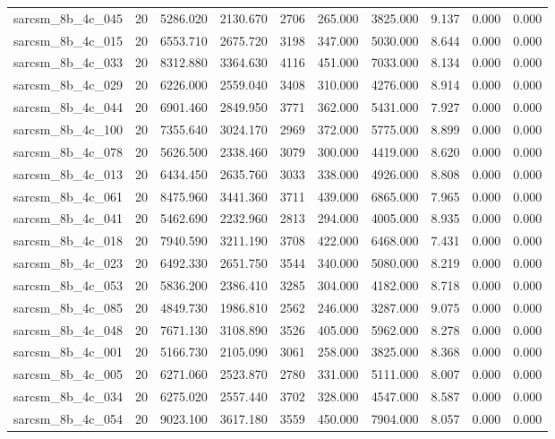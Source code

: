 \begin{tabular}{lrrrrrrrrr}
sarcsm\_8b\_4c\_045 & 20 & 5286.020 & 2130.670 & 2706 & 265.000 & 3825.000 & 9.137 & 0.000 & 0.000 \\
sarcsm\_8b\_4c\_015 & 20 & 6553.710 & 2675.720 & 3198 & 347.000 & 5030.000 & 8.644 & 0.000 & 0.000 \\
sarcsm\_8b\_4c\_033 & 20 & 8312.880 & 3364.630 & 4116 & 451.000 & 7033.000 & 8.134 & 0.000 & 0.000 \\
sarcsm\_8b\_4c\_029 & 20 & 6226.000 & 2559.040 & 3408 & 310.000 & 4276.000 & 8.914 & 0.000 & 0.000 \\
sarcsm\_8b\_4c\_044 & 20 & 6901.460 & 2849.950 & 3771 & 362.000 & 5431.000 & 7.927 & 0.000 & 0.000 \\
sarcsm\_8b\_4c\_100 & 20 & 7355.640 & 3024.170 & 2969 & 372.000 & 5775.000 & 8.899 & 0.000 & 0.000 \\
sarcsm\_8b\_4c\_078 & 20 & 5626.500 & 2338.460 & 3079 & 300.000 & 4419.000 & 8.620 & 0.000 & 0.000 \\
sarcsm\_8b\_4c\_013 & 20 & 6434.450 & 2635.760 & 3033 & 338.000 & 4926.000 & 8.808 & 0.000 & 0.000 \\
sarcsm\_8b\_4c\_061 & 20 & 8475.960 & 3441.360 & 3711 & 439.000 & 6865.000 & 7.965 & 0.000 & 0.000 \\
sarcsm\_8b\_4c\_041 & 20 & 5462.690 & 2232.960 & 2813 & 294.000 & 4005.000 & 8.935 & 0.000 & 0.000 \\
sarcsm\_8b\_4c\_018 & 20 & 7940.590 & 3211.190 & 3708 & 422.000 & 6468.000 & 7.431 & 0.000 & 0.000 \\
sarcsm\_8b\_4c\_023 & 20 & 6492.330 & 2651.750 & 3544 & 340.000 & 5080.000 & 8.219 & 0.000 & 0.000 \\
sarcsm\_8b\_4c\_053 & 20 & 5836.200 & 2386.410 & 3285 & 304.000 & 4182.000 & 8.718 & 0.000 & 0.000 \\
sarcsm\_8b\_4c\_085 & 20 & 4849.730 & 1986.810 & 2562 & 246.000 & 3287.000 & 9.075 & 0.000 & 0.000 \\
sarcsm\_8b\_4c\_048 & 20 & 7671.130 & 3108.890 & 3526 & 405.000 & 5962.000 & 8.278 & 0.000 & 0.000 \\
sarcsm\_8b\_4c\_001 & 20 & 5166.730 & 2105.090 & 3061 & 258.000 & 3825.000 & 8.368 & 0.000 & 0.000 \\
sarcsm\_8b\_4c\_005 & 20 & 6271.060 & 2523.870 & 2780 & 331.000 & 5111.000 & 8.007 & 0.000 & 0.000 \\
sarcsm\_8b\_4c\_034 & 20 & 6275.020 & 2557.440 & 3702 & 328.000 & 4547.000 & 8.587 & 0.000 & 0.000 \\
sarcsm\_8b\_4c\_054 & 20 & 9023.100 & 3617.180 & 3559 & 450.000 & 7904.000 & 8.057 & 0.000 & 0.000 \\

\end{tabular}
